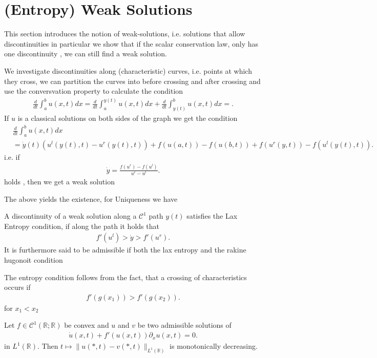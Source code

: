 \section{(Entropy) Weak Solutions}
This section introduces the notion of weak-solutions, i.e. solutions that allow discontinuities 
in particular we show that if the scalar conservation law, only has one discontinuity , we can still find a weak solution.\\[1ex]
\begin{note}
 We investigate discontinuities along (characteristic)  curves, i.e. points at which they cross, we can partition the curves into before crossing and after crossing and use the conversvation property to calculate the condition
 \begin{align*}
   \frac{d}{dt} \int_a^{b} u(x,t)  dx = \frac{d}{dt} \int_a^{y(t)} u(x,t) dx + \frac{d}{dt} \int_{y(t)}^{b}   u(x,t) dx = 
 .\end{align*}
 If $u$ is a classical solutions on both sides of the graph we get the condition
 \begin{align*}
 &\frac{d}{dt} \int_a^{b}u(x,t) dx \\
 &= \dot{y}(t) (u^{l}(y(t),t) - u^{r}(y(t),t) )  + f(u(a,t)) - f(u(b,t)) + f(u^{r}(y,t) ) - f(u^{l}(y(t),t) )
 .\end{align*}
i.e. if 
\begin{align*}
  \dot{y} = \frac{f(u^{r} )-f(u^{l} )}{u^{r}-u^{l}  } 
.\end{align*}
holds , then we get a weak solution
\end{note}
The above yields the existence, for Uniqueness we have
\begin{Definition}[1.1.2]
 A discontinuity of a weak solution along a $\mathcal{C}^{1} $ path $y(t)$ satisfies the Lax Entropy condition, if along the path it holds that 
 \begin{align*}
  f'(u^{l} ) > \dot{y} > f'(u^{r} ) 
 .\end{align*}
It is furthermore said to be admissible if both the lax entropy and the rakine hugonoit condition
\end{Definition}
\begin{note}
 The entropy condition follows from the fact, that a crossing of characteristics occurs if 
 \begin{align*}
  f'(g(x_{1})) > f'(g(x_{2}))
 .\end{align*}
 for $x_{1}<x_{2}$ 
\end{note}
\begin{Theorem}[1.13]
 Let $f \in  \mathcal{C}^{1}(\mathbb{R};\mathbb{R}) $  be convex and $u$ and $v$ be two admissible solutions of 
 \begin{align*}
  \dot{u}(x,t) + f'(u(x,t))\partial_x u (x,t) = 0
 .\end{align*}
 in $L^{1}(\mathbb{R}) $. Then $t \mapsto \|u(*,t) - v(*,t)\|_{L^{1}(\mathbb{R}) }$ is monotonically decreasing.
\end{Theorem}
